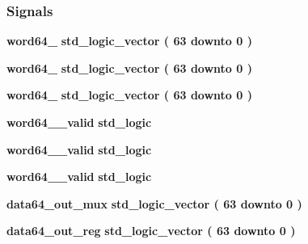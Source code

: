 \subsubsection*{Signals}
 \begin{DoxyCompactItemize}
\item 
{\bf word64\+\_} {\bfseries \textcolor{comment}{std\+\_\+logic\+\_\+vector}\textcolor{vhdlchar}{ }\textcolor{vhdlchar}{(}\textcolor{vhdlchar}{ }\textcolor{vhdlchar}{ } \textcolor{vhdldigit}{63} \textcolor{vhdlchar}{ }\textcolor{keywordflow}{downto}\textcolor{vhdlchar}{ }\textcolor{vhdlchar}{ } \textcolor{vhdldigit}{0} \textcolor{vhdlchar}{ }\textcolor{vhdlchar}{)}\textcolor{vhdlchar}{ }} 
\item 
{\bf word64\+\_} {\bfseries \textcolor{comment}{std\+\_\+logic\+\_\+vector}\textcolor{vhdlchar}{ }\textcolor{vhdlchar}{(}\textcolor{vhdlchar}{ }\textcolor{vhdlchar}{ } \textcolor{vhdldigit}{63} \textcolor{vhdlchar}{ }\textcolor{keywordflow}{downto}\textcolor{vhdlchar}{ }\textcolor{vhdlchar}{ } \textcolor{vhdldigit}{0} \textcolor{vhdlchar}{ }\textcolor{vhdlchar}{)}\textcolor{vhdlchar}{ }} 
\item 
{\bf word64\+\_} {\bfseries \textcolor{comment}{std\+\_\+logic\+\_\+vector}\textcolor{vhdlchar}{ }\textcolor{vhdlchar}{(}\textcolor{vhdlchar}{ }\textcolor{vhdlchar}{ } \textcolor{vhdldigit}{63} \textcolor{vhdlchar}{ }\textcolor{keywordflow}{downto}\textcolor{vhdlchar}{ }\textcolor{vhdlchar}{ } \textcolor{vhdldigit}{0} \textcolor{vhdlchar}{ }\textcolor{vhdlchar}{)}\textcolor{vhdlchar}{ }} 
\item 
{\bf word64\+\_\+\_\+valid} {\bfseries \textcolor{comment}{std\+\_\+logic}\textcolor{vhdlchar}{ }} 
\item 
{\bf word64\+\_\+\_\+valid} {\bfseries \textcolor{comment}{std\+\_\+logic}\textcolor{vhdlchar}{ }} 
\item 
{\bf word64\+\_\+\_\+valid} {\bfseries \textcolor{comment}{std\+\_\+logic}\textcolor{vhdlchar}{ }} 
\item 
{\bf data64\+\_\+out\+\_\+mux} {\bfseries \textcolor{comment}{std\+\_\+logic\+\_\+vector}\textcolor{vhdlchar}{ }\textcolor{vhdlchar}{(}\textcolor{vhdlchar}{ }\textcolor{vhdlchar}{ } \textcolor{vhdldigit}{63} \textcolor{vhdlchar}{ }\textcolor{keywordflow}{downto}\textcolor{vhdlchar}{ }\textcolor{vhdlchar}{ } \textcolor{vhdldigit}{0} \textcolor{vhdlchar}{ }\textcolor{vhdlchar}{)}\textcolor{vhdlchar}{ }} 
\item 
{\bf data64\+\_\+out\+\_\+reg} {\bfseries \textcolor{comment}{std\+\_\+logic\+\_\+vector}\textcolor{vhdlchar}{ }\textcolor{vhdlchar}{(}\textcolor{vhdlchar}{ }\textcolor{vhdlchar}{ } \textcolor{vhdldigit}{63} \textcolor{vhdlchar}{ }\textcolor{keywordflow}{downto}\textcolor{vhdlchar}{ }\textcolor{vhdlchar}{ } \textcolor{vhdldigit}{0} \textcolor{vhdlchar}{ }\textcolor{vhdlchar}{)}\textcolor{vhdlchar}{ }} 

\end{DoxyCompactItemize}
